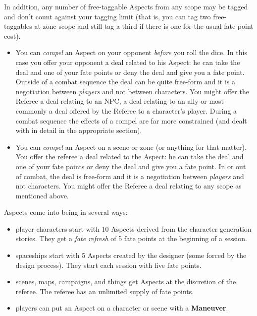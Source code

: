 In addition, any number of free-taggable Aspects from any scope may be tagged and don't count against your tagging limit (that is, you can tag two free-taggables at zone scope and still tag a third if there is one for the usual fate point cost).
\begin{itemize}
\item You can \emph{compel} an Aspect on your opponent \emph{before} you roll the dice. In this case you offer your opponent a deal related to his Aspect: he can take the deal and one of your fate points or deny the deal and give you a fate point. Outside of a combat sequence the deal can be quite free-form and it is a negotiation between \emph{players} and not between characters. You might offer the Referee a deal relating to an NPC, a deal relating to an ally or most commonly a deal offered by the Referee to a character's player. During a combat sequence the effects of a compel are far more constrained (and dealt with in detail in the appropriate section).

\item You can \emph{compel} an Aspect on a scene or zone (or anything for that matter). You offer the referee a deal related to the Aspect: he can take the deal and one of your fate points or deny the deal and give you a fate point. In or out of combat, the deal is free-form and it is a negotiation between \emph{players} and not characters. You might offer the Referee a deal relating to any scope as mentioned above.
\end{itemize}

Aspects come into being in several ways:
\begin{itemize}
\item player characters start with 10 Aspects derived from the character generation stories. They get a \emph{fate refresh} of 5 fate points at the beginning of a session.

\item spaceships start with 5 Aspects created by the designer (some forced by the design process). They start each session with five fate points.

\item scenes, maps, campaigns, and things get Aspects at the discretion of the referee. The referee has an unlimited supply of fate points.

\item players can put an Aspect on a character or scene with a \textbf{Maneuver}.
\end{itemize}

